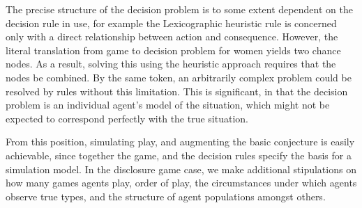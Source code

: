 The precise structure of the decision problem is to some extent dependent on the decision rule in use, for example the Lexicographic heuristic rule is concerned only with a direct relationship between action and consequence. However, the literal translation from game to decision problem for women yields two chance nodes. As a result, solving this using the heuristic approach requires that the nodes be combined. By the same token, an arbitrarily complex problem could be resolved by rules without this limitation. This is significant, in that the decision problem is an individual agent's model of the situation, which might not be expected to correspond perfectly with the true situation.

From this position, simulating play, and augmenting the basic conjecture is easily achievable, since together the game, and the decision rules specify the basis for a simulation model. In the disclosure game case, we make additional stipulations on how many games agents play, order of play, the circumstances under which agents observe true types, and the structure of agent populations amongst others. 

